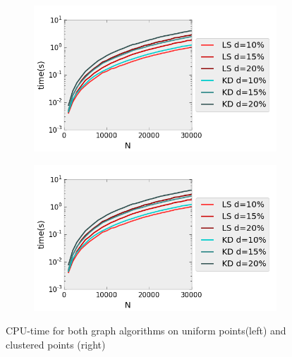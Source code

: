 \begin{figure}[H] 
  \begin{subfigure}[b]{0.5\linewidth}
    \centering
    \includegraphics[width=0.9\linewidth]{Pictures/unif_kd_ls_t} 
    \label{fig:unif_kd_ls_t} 
    \vspace{4ex}
  \end{subfigure}%
  \begin{subfigure}[b]{0.5\linewidth}
    \centering
    \includegraphics[width=0.9\linewidth]{Pictures/unif_kd_ls_t} 
    \label{fig:clus_kd_ls_t} 
    \vspace{4ex}
  \end{subfigure}
  \caption{CPU-time for both graph algorithms on uniform points(left) and clustered points (right)}
  \label{fig:kd_ls_t} 
\end{figure}

